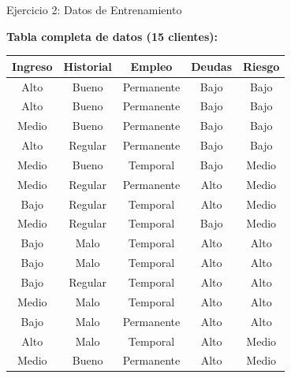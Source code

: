 \documentclass{beamer}
\begin{document}
\begin{frame}{Ejercicio 2: Datos de Entrenamiento}
    \begin{center}
        \textbf{Tabla completa de datos (15 clientes):}

        \vspace{0.3cm}

        \tiny
        \begin{tabular}{ccccc}
            \toprule
            Ingreso & Historial & Empleo & Deudas & Riesgo \\
            \midrule
            Alto & Bueno & Permanente & Bajo & Bajo \\
            Alto & Bueno & Permanente & Bajo & Bajo \\
            Medio & Bueno & Permanente & Bajo & Bajo \\
            Alto & Regular & Permanente & Bajo & Bajo \\
            Medio & Bueno & Temporal & Bajo & Medio \\
            Medio & Regular & Permanente & Alto & Medio \\
            Bajo & Regular & Temporal & Alto & Medio \\
            Medio & Regular & Temporal & Bajo & Medio \\
            Bajo & Malo & Temporal & Alto & Alto \\
            Bajo & Malo & Temporal & Alto & Alto \\
            Bajo & Regular & Temporal & Alto & Alto \\
            Medio & Malo & Temporal & Alto & Alto \\
            Bajo & Malo & Permanente & Alto & Alto \\
            Alto & Malo & Temporal & Alto & Medio \\
            Medio & Bueno & Permanente & Alto & Medio \\
            \bottomrule
        \end{tabular}
    \end{center}
\end{frame}
\end{document}
